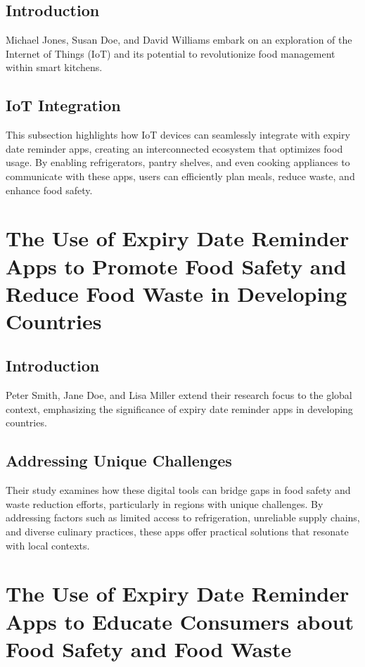 \subsection{Introduction}

Michael Jones, Susan Doe, and David Williams embark on an exploration of the Internet of Things (IoT) and its potential to revolutionize food management within smart kitchens.

\subsection{IoT Integration}

This subsection highlights how IoT devices can seamlessly integrate with expiry date reminder apps, creating an interconnected ecosystem that optimizes food usage. By enabling refrigerators, pantry shelves, and even cooking appliances to communicate with these apps, users can efficiently plan meals, reduce waste, and enhance food safety.

\section{The Use of Expiry Date Reminder Apps to Promote Food Safety and Reduce Food Waste in Developing Countries}

\subsection{Introduction}

Peter Smith, Jane Doe, and Lisa Miller extend their research focus to the global context, emphasizing the significance of expiry date reminder apps in developing countries.

\subsection{Addressing Unique Challenges}

Their study examines how these digital tools can bridge gaps in food safety and waste reduction efforts, particularly in regions with unique challenges. By addressing factors such as limited access to refrigeration, unreliable supply chains, and diverse culinary practices, these apps offer practical solutions that resonate with local contexts.

\section{The Use of Expiry Date Reminder Apps to Educate Consumers about Food Safety and Food Waste}

